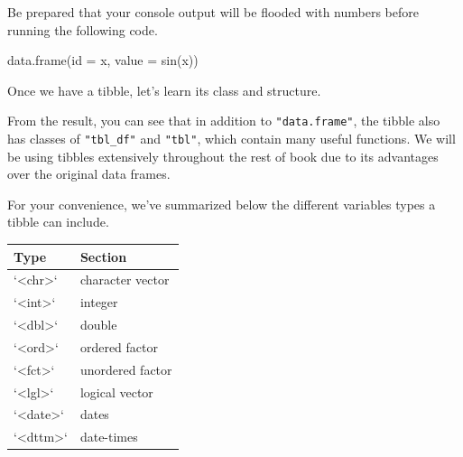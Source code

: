 \documentclass[
]{book}
\newenvironment{Shaded}{\begin{snugshade}}{\end{snugshade}}
\newcommand{\AttributeTok}[1]{\textcolor[rgb]{0.77,0.63,0.00}{#1}}
\newcommand{\CommentTok}[1]{\textcolor[rgb]{0.56,0.35,0.01}{\textit{#1}}}
\newcommand{\FunctionTok}[1]{\textcolor[rgb]{0.00,0.00,0.00}{#1}}
\newcommand{\NormalTok}[1]{#1}
\begin{document}
Be prepared that your console output will be flooded with numbers before running the following code.

\begin{Shaded}
\begin{Highlighting}[]
\FunctionTok{data.frame}\NormalTok{(}\AttributeTok{id =}\NormalTok{ x, }\AttributeTok{value =} \FunctionTok{sin}\NormalTok{(x)) }
\end{Highlighting}
\end{Shaded}

Once we have a tibble, let's learn its class and structure.

\begin{Shaded}
\end{Shaded}

From the result, you can see that in addition to \texttt{"data.frame"}, the tibble also has classes of \texttt{"tbl\_df"} and \texttt{"tbl"}, which contain many useful functions. We will be using tibbles extensively throughout the rest of book due to its advantages over the original data frames.

For your convenience, we've summarized below the different variables types a tibble can include.

\begin{tabular}{l|l}
\hline
Type & Section\\
\hline
`<chr>` & character vector\\
\hline
`<int>` & integer\\
\hline
`<dbl>` & double\\
\hline
`<ord>` & ordered factor\\
\hline
`<fct>` & unordered factor\\
\hline
`<lgl>` & logical vector\\
\hline
`<date>` & dates\\
\hline
`<dttm>` & date-times\\
\hline
\end{tabular}
\end{document}
